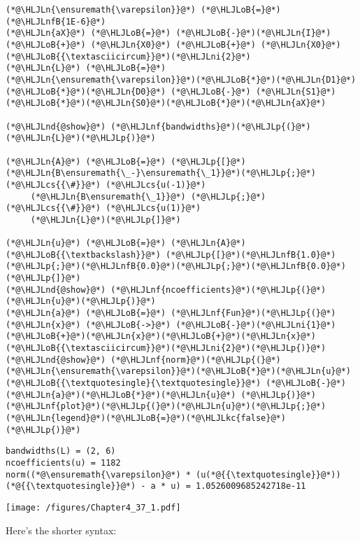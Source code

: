 \documentclass[12pt,a4paper]{article}
\newcommand{\HLJLkc}[1]{\textcolor[RGB]{59,151,46}{\textit{#1}}}
\newcommand{\HLJLn}[1]{#1}
\newcommand{\HLJLnd}[1]{\textcolor[RGB]{214,102,97}{#1}}
\newcommand{\HLJLnf}[1]{\textcolor[RGB]{66,102,213}{#1}}
\newcommand{\HLJLnfB}[1]{\textcolor[RGB]{59,151,46}{#1}}
\newcommand{\HLJLni}[1]{\textcolor[RGB]{59,151,46}{#1}}
\newcommand{\HLJLoB}[1]{\textcolor[RGB]{102,102,102}{\textbf{#1}}}
\newcommand{\HLJLp}[1]{#1}
\newcommand{\HLJLcs}[1]{\textcolor[RGB]{153,153,119}{\textit{#1}}}
\begin{document}
\begin{lstlisting}
(*@\HLJLn{\ensuremath{\varepsilon}}@*) (*@\HLJLoB{=}@*) (*@\HLJLnfB{1E-6}@*)
(*@\HLJLn{aX}@*) (*@\HLJLoB{=}@*) (*@\HLJLoB{-}@*)(*@\HLJLn{I}@*) (*@\HLJLoB{+}@*) (*@\HLJLn{X0}@*) (*@\HLJLoB{+}@*) (*@\HLJLn{X0}@*)(*@\HLJLoB{{\textasciicircum}}@*)(*@\HLJLni{2}@*)
(*@\HLJLn{L}@*) (*@\HLJLoB{=}@*) (*@\HLJLn{\ensuremath{\varepsilon}}@*)(*@\HLJLoB{*}@*)(*@\HLJLn{D1}@*)(*@\HLJLoB{*}@*)(*@\HLJLn{D0}@*) (*@\HLJLoB{-}@*) (*@\HLJLn{S1}@*)(*@\HLJLoB{*}@*)(*@\HLJLn{S0}@*)(*@\HLJLoB{*}@*)(*@\HLJLn{aX}@*)

(*@\HLJLnd{@show}@*) (*@\HLJLnf{bandwidths}@*)(*@\HLJLp{(}@*)(*@\HLJLn{L}@*)(*@\HLJLp{)}@*)

(*@\HLJLn{A}@*) (*@\HLJLoB{=}@*) (*@\HLJLp{[}@*)(*@\HLJLn{B\ensuremath{\_-}\ensuremath{\_1}}@*)(*@\HLJLp{;}@*)   (*@\HLJLcs{{\#}}@*) (*@\HLJLcs{u(-1)}@*)
     (*@\HLJLn{B\ensuremath{\_1}}@*) (*@\HLJLp{;}@*)   (*@\HLJLcs{{\#}}@*) (*@\HLJLcs{u(1)}@*)
     (*@\HLJLn{L}@*)(*@\HLJLp{]}@*)   

(*@\HLJLn{u}@*) (*@\HLJLoB{=}@*) (*@\HLJLn{A}@*) (*@\HLJLoB{{\textbackslash}}@*) (*@\HLJLp{[}@*)(*@\HLJLnfB{1.0}@*)(*@\HLJLp{;}@*)(*@\HLJLnfB{0.0}@*)(*@\HLJLp{;}@*)(*@\HLJLnfB{0.0}@*)(*@\HLJLp{]}@*)
(*@\HLJLnd{@show}@*) (*@\HLJLnf{ncoefficients}@*)(*@\HLJLp{(}@*)(*@\HLJLn{u}@*)(*@\HLJLp{)}@*)
(*@\HLJLn{a}@*) (*@\HLJLoB{=}@*) (*@\HLJLnf{Fun}@*)(*@\HLJLp{(}@*)(*@\HLJLn{x}@*) (*@\HLJLoB{->}@*) (*@\HLJLoB{-}@*)(*@\HLJLni{1}@*)(*@\HLJLoB{+}@*)(*@\HLJLn{x}@*)(*@\HLJLoB{+}@*)(*@\HLJLn{x}@*)(*@\HLJLoB{{\textasciicircum}}@*)(*@\HLJLni{2}@*)(*@\HLJLp{)}@*)
(*@\HLJLnd{@show}@*) (*@\HLJLnf{norm}@*)(*@\HLJLp{(}@*)(*@\HLJLn{\ensuremath{\varepsilon}}@*)(*@\HLJLoB{*}@*)(*@\HLJLn{u}@*)(*@\HLJLoB{{\textquotesingle}{\textquotesingle}}@*) (*@\HLJLoB{-}@*) (*@\HLJLn{a}@*)(*@\HLJLoB{*}@*)(*@\HLJLn{u}@*) (*@\HLJLp{)}@*)
(*@\HLJLnf{plot}@*)(*@\HLJLp{(}@*)(*@\HLJLn{u}@*)(*@\HLJLp{;}@*) (*@\HLJLn{legend}@*)(*@\HLJLoB{=}@*)(*@\HLJLkc{false}@*)(*@\HLJLp{)}@*)
\end{lstlisting}

\begin{lstlisting}
bandwidths(L) = (2, 6)
ncoefficients(u) = 1182
norm((*@\ensuremath{\varepsilon}@*) * (u(*@{{\textquotesingle}}@*))(*@{{\textquotesingle}}@*) - a * u) = 1.0526009685242718e-11
\end{lstlisting}

\texttt{[image: /figures/Chapter4\_37\_1.pdf]}

Here's the shorter syntax:
\end{document}
